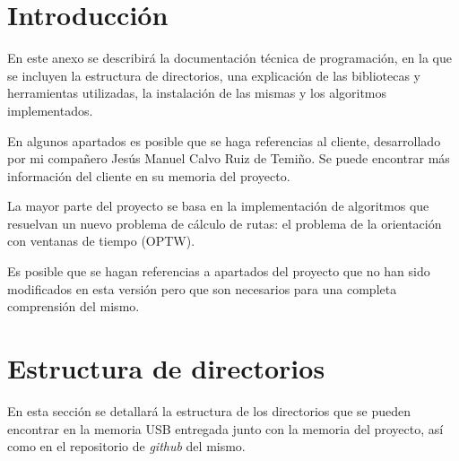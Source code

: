 

\section{Introducción}
En este anexo se describirá la documentación técnica de programación, en la que se incluyen la estructura de directorios, una explicación de las bibliotecas y herramientas utilizadas, la instalación de las mismas y los algoritmos implementados.

En algunos apartados es posible que se haga referencias al cliente, desarrollado por mi compañero Jesús Manuel Calvo Ruiz de Temiño. Se puede encontrar más información del cliente en su memoria del proyecto.

La mayor parte del proyecto se basa en la implementación de algoritmos que resuelvan un nuevo problema de cálculo de rutas: el problema de la orientación con ventanas de tiempo (OPTW).

Es posible que se hagan referencias a apartados del proyecto que no han sido modificados en esta versión pero que son necesarios para una completa comprensión del mismo.
\section{Estructura de directorios}
En esta sección se detallará la estructura de los directorios que se pueden encontrar en la memoria USB entregada junto con la memoria del proyecto, así como en el repositorio de \textit{github} del mismo.

